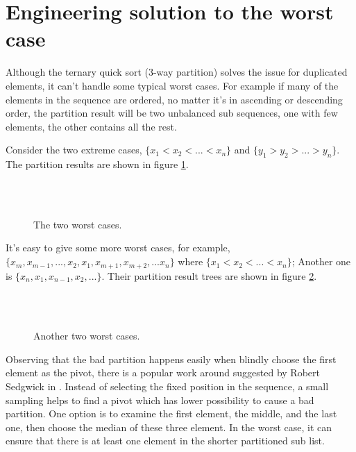 \documentclass[UTF8]{article}
\begin{document}
\section{Engineering solution to the worst case}
Although the ternary quick sort (3-way partition) solves the issue for duplicated elements, it can't handle
some typical worst cases. For example if many of the elements in the sequence are ordered, no matter it's
in ascending or descending order, the partition result will be two unbalanced sub sequences, one with few elements,
the other contains all the rest.

Consider the two extreme cases, $\{ x_1 < x_2 < ... < x_n\}$ and $\{ y_1 > y_2 > ... > y_n\}$. The partition
results are shown in figure \ref{fig:worst-cases-1}.

\begin{figure}[htbp]
   \centering
    \\
    \\
   \caption{The two worst cases.}
   \label{fig:worst-cases-1}
\end{figure}

It's easy to give some more worst cases, for example, $\{ x_m, x_{m-1}, ..., x_2, x_1, x_{m+1}, x_{m+2}, ... x_n\}$
where $\{ x_1 < x_2 < ... < x_n \}$;
Another one is $\{x_n, x_1, x_{n-1}, x_2, ... \}$. Their partition result trees are shown
in figure \ref{fig:worst-cases-2}.

\begin{figure}[htbp]
   \centering
    \\
    \\
   \caption{Another two worst cases.}
   \label{fig:worst-cases-2}
\end{figure}

Observing that the bad partition happens easily when blindly choose the first element as the pivot,
there is a popular work around suggested by Robert Sedgwick in \cite{qsort-impl}. Instead of
selecting the fixed position in the sequence, a small sampling helps to find a pivot which
has lower possibility to cause a bad partition. One option is to examine the first element, the
middle, and the last one, then choose the median of these three element. In the worst case,
it can ensure that there is at least one element in the shorter partitioned sub list.
\end{document}
